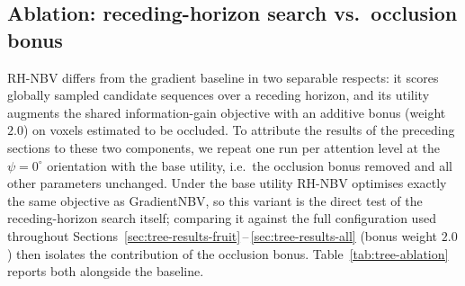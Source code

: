 \subsection{Ablation: receding-horizon search vs.\ occlusion bonus}
\label{sec:tree-results-ablation}

RH-NBV differs from the gradient baseline in two separable respects: it
scores globally sampled candidate sequences over a receding horizon, and its
utility augments the shared information-gain objective with an additive
bonus (weight $2.0$) on voxels estimated to be occluded. To attribute the
results of the preceding sections to these two components, we repeat one run
per attention level at the $\psi = 0^\circ$ orientation with the base
utility, i.e.\ the occlusion bonus removed and all other parameters
unchanged. Under the base utility RH-NBV optimises exactly the same
objective as GradientNBV, so this variant is the direct test of the
receding-horizon search itself; comparing it against the full configuration
used throughout Sections~\ref{sec:tree-results-fruit}\,--\,\ref{sec:tree-results-all}
(bonus weight $2.0$) then isolates the contribution of the occlusion bonus.
Table~\ref{tab:tree-ablation} reports both alongside the baseline.

